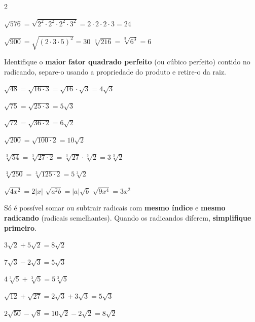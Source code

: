\documentclass[12pt]{article}
\begin{document}
\begin{multicols}{2}
\vspace{0.3cm}

$\sqrt{576} = \sqrt{2^2 \cdot 2^2 \cdot 2^2 \cdot 3^2} = 2 \cdot 2 \cdot 2 \cdot 3 = 24$

\vspace{4px}

$\sqrt{900} = \sqrt{(2\cdot3\cdot5)^2} = 30$ \qquad $\sqrt[3]{216} = \sqrt[3]{6^3} = 6$


Identifique o \textbf{maior fator quadrado perfeito} (ou cúbico perfeito) contido no radicando, separe-o usando a propriedade do produto e retire-o da raiz.


$\sqrt{48} = \sqrt{16 \cdot 3} = \sqrt{16} \cdot \sqrt{3} = 4\sqrt{3}$

$\sqrt{75} = \sqrt{25 \cdot 3} = 5\sqrt{3}$

$\sqrt{72} = \sqrt{36 \cdot 2} = 6\sqrt{2}$

$\sqrt{200} = \sqrt{100 \cdot 2} = 10\sqrt{2}$


$\sqrt[3]{54} = \sqrt[3]{27 \cdot 2} = \sqrt[3]{27} \cdot \sqrt[3]{2} = 3\sqrt[3]{2}$

$\sqrt[3]{250} = \sqrt[3]{125 \cdot 2} = 5\sqrt[3]{2}$


$\sqrt{4x^2} = 2|x|$ \qquad $\sqrt{a^2 b} = |a|\sqrt{b}$ \qquad $\sqrt{9x^4} = 3x^2$


Só é possível somar ou subtrair radicais com \textbf{mesmo índice} e \textbf{mesmo radicando} (radicais semelhantes). Quando os radicandos diferem, \textbf{simplifique primeiro}.


$3\sqrt{2} + 5\sqrt{2} = 8\sqrt{2}$

$7\sqrt{3} - 2\sqrt{3} = 5\sqrt{3}$

$4\sqrt[3]{5} + \sqrt[3]{5} = 5\sqrt[3]{5}$


$\sqrt{12} + \sqrt{27} = 2\sqrt{3} + 3\sqrt{3} = 5\sqrt{3}$

$2\sqrt{50} - \sqrt{8} = 10\sqrt{2} - 2\sqrt{2} = 8\sqrt{2}$


\end{multicols}
\end{document}
